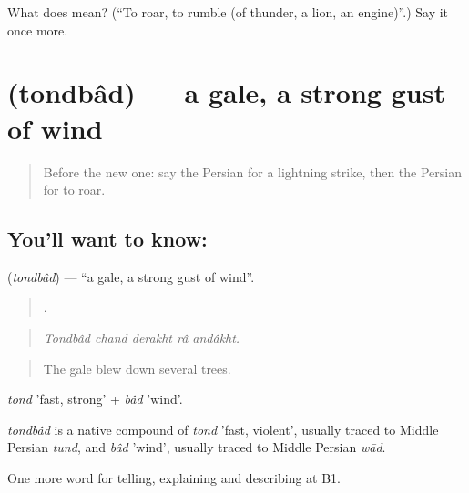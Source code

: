 \begin{tcolorbox}[breakable,colback=teal!4,colframe=teal!35!black,title={Before you move on}]
What does   mean? (\textquotedblleft{}To roar, to rumble (of thunder, a lion, an engine)\textquotedblright{}.) Say it once more.
\end{tcolorbox}
\section[\texorpdfstring{\fa{تندباد} (tondbâd)}{تندباد (tondbâd)}]{ (tondbâd) — a gale, a strong gust of wind}

\label{lesson:FA-C475-tondbad}



\begin{quote}
Before the new one: say the Persian for a lightning strike, then the Persian for to roar.
\end{quote}

\subsection*{You'll want to know: }
\textbf{} (\emph{tondbâd}) — \textquotedblleft{}a gale, a strong gust of wind\textquotedblright{}.

\begin{quote}
    .
\end{quote}

\begin{quote}
\emph{Tondbâd chand derakht râ andâkht.}
\end{quote}

\begin{quote}
The gale blew down several trees.
\end{quote}

\emph{tond} 'fast, strong' + \emph{bâd} 'wind'.

\begin{cousinweb}
\emph{tondbâd} is a native compound of \emph{tond} 'fast, violent', usually traced to Middle Persian \emph{tund}, and \emph{bâd} 'wind', usually traced to Middle Persian \emph{wād}.
\end{cousinweb}

\begin{grammarlens}[title={What you've built}]
One more word for telling, explaining and describing at B1.
\end{grammarlens}

